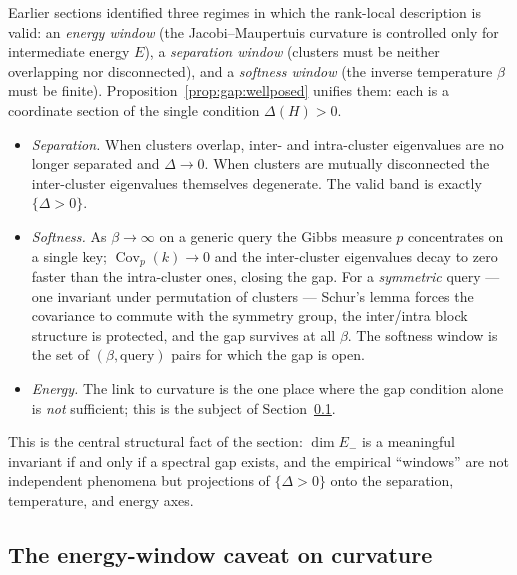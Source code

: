 Earlier sections identified three regimes in which the rank-local description
is valid: an \emph{energy window} (the Jacobi--Maupertuis curvature is
controlled only for intermediate energy $E$), a \emph{separation window}
(clusters must be neither overlapping nor disconnected), and a
\emph{softness window} (the inverse temperature $\beta$ must be finite).
Proposition~\ref{prop:gap:wellposed} unifies them: each is a coordinate
section of the single condition $\Delta(H)>0$.

\begin{itemize}
  \item \emph{Separation.} When clusters overlap, inter- and intra-cluster
    eigenvalues are no longer separated and $\Delta\to0$. When clusters are
    mutually disconnected the inter-cluster eigenvalues themselves degenerate.
    The valid band is exactly $\{\Delta>0\}$.
  \item \emph{Softness.} As $\beta\to\infty$ on a generic query the Gibbs
    measure $p$ concentrates on a single key; $\operatorname{Cov}_p(k)\to 0$
    and the inter-cluster eigenvalues decay to zero faster than the
    intra-cluster ones, closing the gap. For a \emph{symmetric} query --- one
    invariant under permutation of clusters --- Schur's lemma forces the
    covariance to commute with the symmetry group, the inter/intra block
    structure is protected, and the gap survives at all $\beta$. The softness
    window is the set of $(\beta,\text{query})$ pairs for which the gap is
    open.
  \item \emph{Energy.} The link to curvature is the one place where the gap
    condition alone is \emph{not} sufficient; this is the subject of
    Section~\ref{sec:gap:curvature}.
\end{itemize}

This is the central structural fact of the section: $\dim E_-$ is a
meaningful invariant if and only if a spectral gap exists, and the empirical
``windows'' are not independent phenomena but projections of $\{\Delta>0\}$
onto the separation, temperature, and energy axes.

\subsection{The energy-window caveat on curvature}
\label{sec:gap:curvature}


